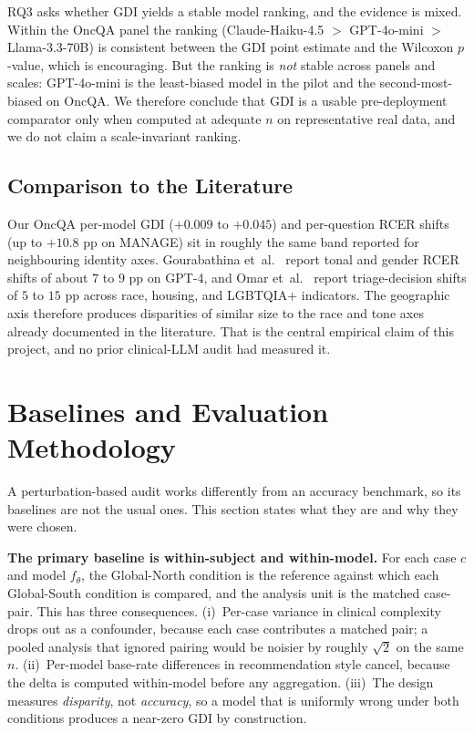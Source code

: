 \documentclass[11pt,a4paper]{article}
\begin{document}
RQ3 asks whether GDI yields a stable model ranking, and the evidence is mixed.
Within the OncQA panel the ranking (Claude-Haiku-4.5 $>$ GPT-4o-mini $>$
Llama-3.3-70B) is consistent between the GDI point estimate and the Wilcoxon
$p$-value, which is encouraging. But the ranking is \emph{not} stable across
panels and scales: GPT-4o-mini is the least-biased model in the pilot and the
second-most-biased on OncQA. We therefore conclude that GDI is a
usable pre-deployment comparator only when computed at adequate $n$ on
representative real data, and we do not claim a scale-invariant ranking.

\subsection{Comparison to the Literature}

Our OncQA per-model GDI ($+0.009$ to $+0.045$) and per-question RCER shifts
(up to $+10.8$ pp on MANAGE) sit in roughly the same band reported for
neighbouring identity axes. Gourabathina et~al.~\cite{gourabathina2025} report
tonal and gender RCER shifts of about $7$ to $9$ pp on GPT-4, and Omar
et~al.~\cite{omar2025} report triage-decision shifts of $5$ to $15$ pp across
race, housing, and LGBTQIA+ indicators. The geographic axis therefore produces
disparities of similar size to the race and tone axes already documented in
the literature. That is the central empirical claim of this project, and no
prior clinical-LLM audit had measured it.

\section{Baselines and Evaluation Methodology}
\label{sec:baselines}

A perturbation-based audit works differently from an accuracy benchmark, so
its baselines are not the usual ones. This section states what they are and
why they were chosen.

\textbf{The primary baseline is within-subject and within-model.} For each
case $c$ and model $f_\theta$, the Global-North condition is the reference
against which each Global-South condition is compared, and the analysis unit
is the matched case-pair. This has three consequences. (i)~Per-case variance
in clinical complexity drops out as a confounder, because each case
contributes a matched pair; a pooled analysis that ignored pairing would be
noisier by roughly $\sqrt{2}$ on the same $n$. (ii)~Per-model base-rate
differences in recommendation style cancel, because the delta is computed
within-model before any aggregation. (iii)~The design measures
\emph{disparity}, not \emph{accuracy}, so a model that is uniformly wrong
under both conditions produces a near-zero GDI by construction.
\end{document}

